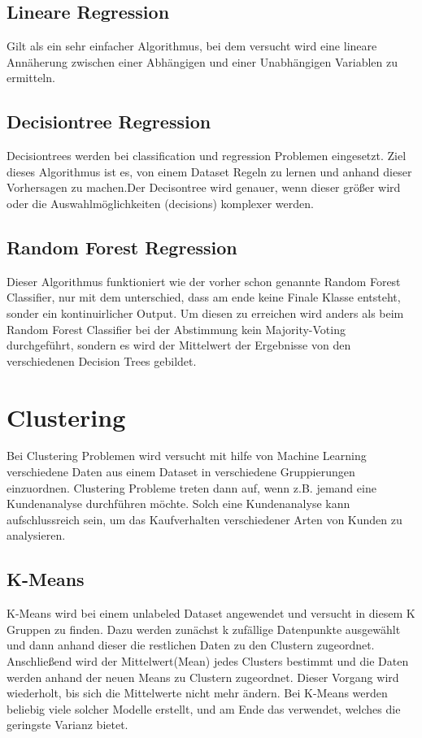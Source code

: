 \subsection{Lineare Regression}
\label{sec:lineareRegression}
Gilt als ein sehr einfacher Algorithmus, bei dem versucht wird eine lineare Annäherung zwischen einer Abhängigen und einer Unabhängigen Variablen zu ermitteln\cite[S.~100.]{WML}.  


\subsection{Decisiontree Regression}
\label{sec:decisiontreeRegression}
Decisiontrees werden bei classification und regression Problemen eingesetzt. Ziel dieses Algorithmus ist es, von einem Dataset Regeln zu lernen und anhand dieser Vorhersagen zu machen.Der Decisontree wird genauer, wenn dieser größer wird oder die Auswahlmöglichkeiten (decisions) komplexer werden\cite{SKLT}.

\subsection{Random Forest Regression}
\label{sec:randomForestRegression}
Dieser Algorithmus funktioniert wie der vorher schon genannte Random Forest Classifier, nur mit dem unterschied, dass am ende keine Finale Klasse entsteht, sonder ein kontinuirlicher Output. Um diesen zu erreichen wird anders als beim Random Forest Classifier bei der Abstimmung kein Majority-Voting durchgeführt, sondern es wird der Mittelwert der Ergebnisse von den verschiedenen Decision Trees gebildet.

\section{Clustering}
\label{sec:clustering}
Bei Clustering Problemen wird versucht mit hilfe von Machine Learning verschiedene Daten aus einem Dataset in verschiedene Gruppierungen einzuordnen\cite[S.~5.]{WML}. Clustering Probleme treten dann auf, wenn z.B. jemand eine Kundenanalyse durchführen möchte. Solch eine Kundenanalyse kann aufschlussreich sein, um das Kaufverhalten verschiedener Arten von Kunden zu analysieren.


\subsection{K-Means}
\label{sec:kMeans}
K-Means wird bei einem unlabeled Dataset angewendet und versucht in diesem K Gruppen zu finden. Dazu werden zunächst k zufällige Datenpunkte ausgewählt und dann anhand dieser die restlichen Daten zu den Clustern zugeordnet. Anschließend wird der Mittelwert(Mean) jedes Clusters bestimmt und die Daten werden anhand der neuen Means zu Clustern zugeordnet. Dieser Vorgang wird wiederholt, bis sich die Mittelwerte nicht mehr ändern. Bei K-Means werden beliebig viele solcher Modelle erstellt, und am Ende das verwendet, welches die geringste Varianz bietet\cite[S.~222.]{WML}.


